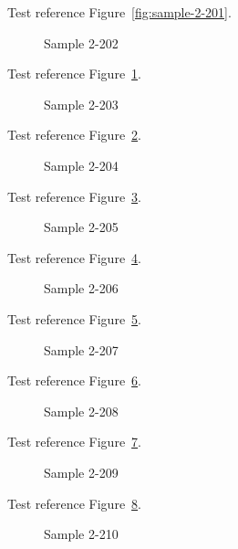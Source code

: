 Test reference Figure~\ref{fig:sample-2-201}.

\begin{figure}[tbhp]
\caption{Sample 2-202}
\label{fig:sample-2-202}
\end{figure}

Test reference Figure~\ref{fig:sample-2-202}.

\begin{figure}[tbhp]
\caption{Sample 2-203}
\label{fig:sample-2-203}
\end{figure}

Test reference Figure~\ref{fig:sample-2-203}.

\begin{figure}[tbhp]
\caption{Sample 2-204}
\label{fig:sample-2-204}
\end{figure}

Test reference Figure~\ref{fig:sample-2-204}.

\begin{figure}[tbhp]
\caption{Sample 2-205}
\label{fig:sample-2-205}
\end{figure}

Test reference Figure~\ref{fig:sample-2-205}.

\begin{figure}[tbhp]
\caption{Sample 2-206}
\label{fig:sample-2-206}
\end{figure}

Test reference Figure~\ref{fig:sample-2-206}.

\begin{figure}[tbhp]
\caption{Sample 2-207}
\label{fig:sample-2-207}
\end{figure}

Test reference Figure~\ref{fig:sample-2-207}.

\begin{figure}[tbhp]
\caption{Sample 2-208}
\label{fig:sample-2-208}
\end{figure}

Test reference Figure~\ref{fig:sample-2-208}.

\begin{figure}[tbhp]
\caption{Sample 2-209}
\label{fig:sample-2-209}
\end{figure}

Test reference Figure~\ref{fig:sample-2-209}.

\begin{figure}[tbhp]
\caption{Sample 2-210}
\label{fig:sample-2-210}
\end{figure}

